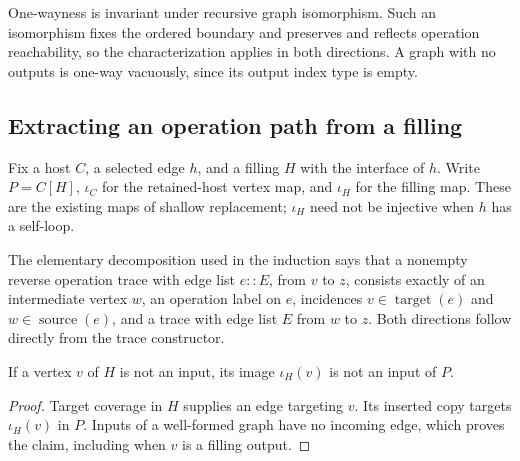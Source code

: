 One-wayness is invariant under recursive graph isomorphism. Such an
isomorphism fixes the ordered boundary and preserves and reflects operation
reachability, so the characterization applies in both directions. A graph
with no outputs is one-way vacuously, since its output index type is empty.

\subsection{Extracting an operation path from a filling}
Fix a host $C$, a selected edge $h$, and a filling $H$ with the interface of
$h$. Write $P=C[H]$, $\iota_C$ for the retained-host vertex map, and
$\iota_H$ for the filling map. These are the existing maps of shallow
replacement; $\iota_H$ need not be injective when $h$ has a self-loop.

The elementary decomposition used in the induction says that a nonempty
reverse operation trace with edge list $e::E$, from $v$ to $z$, consists
exactly of an intermediate vertex $w$, an operation label on $e$, incidences
$v\in\operatorname{target}(e)$ and $w\in\operatorname{source}(e)$, and a
trace with edge list $E$ from $w$ to $z$. Both directions follow directly
from the trace constructor.

\begin{lemma}
If a vertex $v$ of $H$ is not an input, its image $\iota_H(v)$ is not an
input of $P$.
\end{lemma}
\begin{proof}
Target coverage in $H$ supplies an edge targeting $v$. Its inserted copy
targets $\iota_H(v)$ in $P$. Inputs of a well-formed graph have no incoming
edge, which proves the claim, including when $v$ is a filling output.
\end{proof}

